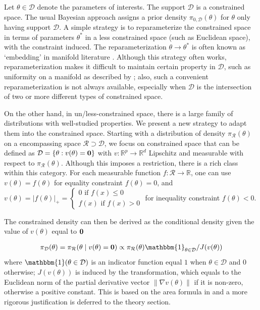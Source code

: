 \documentclass[10pt]{article}
\newcommand{\be}{\begin{equation}\begin{aligned}}
\newcommand{\ee}{\end{aligned}\end{equation}}
\newcommand{\bb}[1]{\mathbb{#1}}
\newcommand{\mc}[1]{\mathcal{#1}}
\DeclareMathOperator{\1}{\mathbbm{1}}
\begin{document}
Let $\theta \in \mc D$ denote the parameters of interests. The support $\mc
D$ is a constrained space. The usual Bayesian approach assigns a prior
density $\pi_{0,\mc D}(\theta)$ for $\theta$ only having support $\mc D$. A
simple strategy is to reparameterize the constrained space in terms of
parameters $\theta^*$ in a less constrained space (such as Euclidean space),
with the constraint induced. The reparameterization 
$\theta\rightarrow\theta^*$ is often known as
`embedding' in manifold literature \citep{nash1954c1,nash1956imbedding}.
Although this strategy often works, reparameterization makes it difficult
to maintain certain property in $\mc D$, such as uniformity on a manifold as described
by \cite{diaconis2013manifold}; also, such a convenient reparameterization is
not always available, especially when $\mc D$ is the intersection of two or
more different types of constrained space.

On the other hand, in un/less-constrained space, there is a large family of
distributions  with well-studied properties. We present a new strategy to
adapt them into the constrained space. Starting with a distribution of
density $\pi_{\mc R}(\theta)$ on a encompassing space $\mc R\supset \mc D$,
we focus on constrained space that can be defined as $\mc D =\{\theta:
v(\theta)={\bf 0}\}$ with $v: \bb{R}^p\rightarrow \bb  R^d$
Lipschitz and measurable with respect to $\pi_{\mc R}(\theta)$. Although
this imposes a restriction, there is a rich class within this category. For
each measurable function $f:\mc R\rightarrow \bb R$, one can use
$v(\theta)=f(\theta)$ for equality
constraint $f(\theta)=0$, and $v(\theta)=|f(\theta)|_+=\left\{\begin{array}{cc}  0 \text{ if } f(x)\le 0
	\\ f(x) \text{ if } f(x)> 0\end{array}\right.$ for inequality
	constraint $f(\theta)<0$.

The constrained density can then be derived as the conditional density given the
value of $v(\theta)$ equal to $\bf 0$

\be
\pi_{\mc D}(\theta)=\pi_{\mc R}(\theta\mid v(\theta)={\bf 0})\propto \pi_{\mc R}(\theta) \mathbbm{1}_{\theta\in \mc
D}/J(v(\theta))
\ee
where $\mathbbm{1}(\theta\in\mc D)$ is an indicator function equal $1$ when
$\theta\in \mc D$ and $0$ otherwise; $J(v(\theta))$ is induced by the
transformation, which equals to
the Euclidean norm of the partial derivative vector $\|\nabla v(\theta)\|$
if it is non-zero, otherwise a positive constant. This is based on the area
formula in \citep{federer2014geometric} and a more rigorous justification
is deferred to the theory section.
\end{document}
